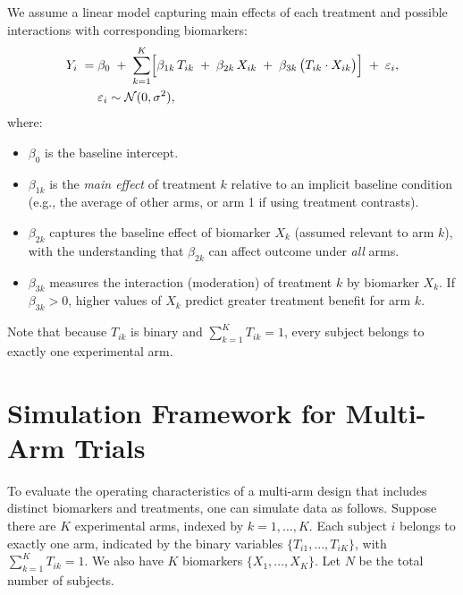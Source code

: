 \documentclass[11pt]{article}
\begin{document}
We assume a linear model capturing main effects of each treatment and possible interactions with corresponding biomarkers:
\[
\begin{aligned}
  Y_i \;=\;& \beta_0
  \;+\; \sum_{k=1}^K \Bigl[
      \beta_{1k}\,T_{ik}
    \;+\;\beta_{2k}\,X_{ik}
    \;+\;\beta_{3k}\,\bigl(T_{ik} \cdot X_{ik}\bigr)
  \Bigr]
  \;+\;\varepsilon_i,
  \\
  &\varepsilon_i \sim \mathcal{N}(0,\sigma^2),
\end{aligned}
\]
where:
\begin{itemize}
  \item \(\beta_0\) is the baseline intercept.
  \item \(\beta_{1k}\) is the \emph{main effect} of treatment \(k\) relative to an implicit baseline condition (e.g., the average of other arms, or arm 1 if using treatment contrasts).
  \item \(\beta_{2k}\) captures the baseline effect of biomarker \(X_k\) (assumed relevant to arm \(k\)), 
        with the understanding that \(\beta_{2k}\) can affect outcome under \emph{all} arms.
  \item \(\beta_{3k}\) measures the interaction (moderation) of treatment \(k\) by biomarker \(X_k\). 
        If \(\beta_{3k} > 0\), higher values of \(X_k\) predict greater treatment benefit for arm \(k\).
\end{itemize}
Note that because \(T_{ik}\) is binary and \(\sum_{k=1}^K T_{ik}=1\), every subject belongs to exactly one experimental arm.

\pagebreak
\section{Simulation Framework for Multi-Arm Trials}

To evaluate the operating characteristics of a multi-arm design that includes distinct biomarkers and treatments, one can simulate data as follows. Suppose there are \(K\) experimental arms, indexed by \(k=1,\dots,K\). Each subject \(i\) belongs to exactly one arm, indicated by the binary variables \(\{T_{i1}, \dots, T_{iK}\}\), with \(\sum_{k=1}^K T_{ik}=1\). We also have \(K\) biomarkers \(\{X_{1}, \dots, X_{K}\}\). Let \(N\) be the total number of subjects.
\end{document}
